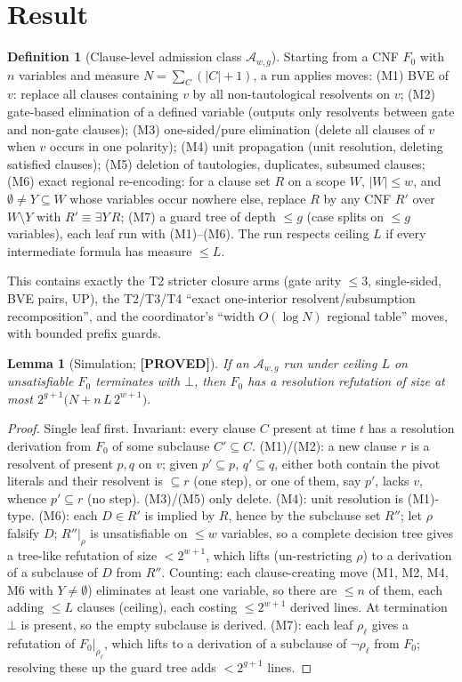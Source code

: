 \documentclass[11pt]{article}
\newtheorem{lemma}[theorem]{Lemma}
\theoremstyle{definition}
\newtheorem{definition}[theorem]{Definition}
\newcommand{\lab}[1]{\textbf{[#1]}}
\begin{document}
\section{Result}
\begin{definition}[Clause-level admission class $\mathcal A_{w,g}$]
Starting from a CNF $F_0$ with $n$ variables and measure $N=\sum_{C}(|C|+1)$, a run applies moves:
(M1) BVE of $v$: replace all clauses containing $v$ by all non-tautological resolvents on $v$;
(M2) gate-based elimination of a defined variable (outputs only resolvents between gate and non-gate clauses);
(M3) one-sided/pure elimination (delete all clauses of $v$ when $v$ occurs in one polarity);
(M4) unit propagation (unit resolution, deleting satisfied clauses);
(M5) deletion of tautologies, duplicates, subsumed clauses;
(M6) exact regional re-encoding: for a clause set $R$ on a scope $W$, $|W|\le w$, and $\emptyset\ne Y\subseteq W$
whose variables occur nowhere else, replace $R$ by any CNF $R'$ over $W\setminus Y$ with $R'\equiv\exists Y\,R$;
(M7) a guard tree of depth $\le g$ (case splits on $\le g$ variables), each leaf run with (M1)--(M6).
The run respects ceiling $L$ if every intermediate formula has measure $\le L$.
\end{definition}
This contains exactly the T2 stricter closure arms (gate arity $\le3$, single-sided, BVE pairs, UP), the
T2/T3/T4 ``exact one-interior resolvent/subsumption recomposition'', and the coordinator's
``width $O(\log N)$ regional table'' moves, with bounded prefix guards.

\begin{lemma}[Simulation; \lab{PROVED}]\label{lem:sim}
If an $\mathcal A_{w,g}$ run under ceiling $L$ on unsatisfiable $F_0$ terminates with $\bot$, then $F_0$ has a
resolution refutation of size at most $2^{g+1}\bigl(N+n\,L\,2^{w+1}\bigr)$.
\end{lemma}
\begin{proof}
Single leaf first. Invariant: every clause $C$ present at time $t$ has a resolution derivation from $F_0$ of some
subclause $C'\subseteq C$. (M1)/(M2): a new clause $r$ is a resolvent of present $p,q$ on $v$; given $p'\subseteq p$,
$q'\subseteq q$, either both contain the pivot literals and their resolvent is $\subseteq r$ (one step), or one of them,
say $p'$, lacks $v$, whence $p'\subseteq r$ (no step). (M3)/(M5) only delete. (M4): unit resolution is (M1)-type.
(M6): each $D\in R'$ is implied by $R$, hence by the subclause set $R''$; let $\rho$ falsify $D$; $R''|_\rho$ is
unsatisfiable on $\le w$ variables, so a complete decision tree gives a tree-like refutation of size $<2^{w+1}$,
which lifts (un-restricting $\rho$) to a derivation of a subclause of $D$ from $R''$. Counting: each clause-creating
move (M1, M2, M4, M6 with $Y\ne\emptyset$) eliminates at least one variable, so there are $\le n$ of them, each adding
$\le L$ clauses (ceiling), each costing $\le 2^{w+1}$ derived lines. At termination $\bot$ is present, so the empty
subclause is derived. (M7): each leaf $\rho_\ell$ gives a refutation of $F_0|_{\rho_\ell}$, which lifts to a derivation
of a subclause of $\neg\rho_\ell$ from $F_0$; resolving these up the guard tree adds $<2^{g+1}$ lines.
\end{proof}
\end{document}
